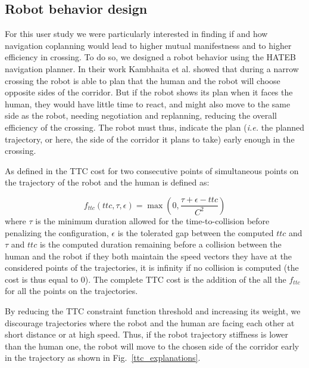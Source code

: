 \documentclass[a4paper,11pt,twoside]{StyleThese}
\begin{document}
\subsection{Robot behavior design}
For this user study we were particularly interested in finding if and how navigation coplanning would lead to higher mutual manifestness and to higher efficiency in crossing.
To do so, we designed a robot behavior using the HATEB navigation planner.
In their work Kambhaita et al. showed that during a narrow crossing the robot is able to plan that the human and the robot will choose opposite sides of the corridor. But if the robot shows its plan when it faces the human, they would have little time to react, and might also move to the same side as the robot, needing negotiation and replanning, reducing the overall efficiency of the crossing. The robot must thus, indicate the plan (\textit{i.e.} the planned trajectory, or here, the side of the corridor it plans to take) early enough in the crossing.

As defined in \cite{khambhaita_viewing_2017} the TTC cost for two consecutive points of simultaneous points on the trajectory of the robot and the human is defined as:

\begin{equation}\label{eq:ttc}
f_{ttc}(ttc, \tau, \epsilon) = \max(0, \frac{\tau + \epsilon - ttc}{C^2})
\end{equation}
where $\tau$ is the minimum duration allowed for the time-to-collision before penalizing the configuration, $\epsilon$ is the tolerated gap between the computed $ttc$ and $\tau$ and $ttc$ is the computed duration remaining before a collision between the human and the robot if they both maintain the speed vectors they have at the considered points of the trajectories, it is infinity if no collision is computed (the cost is thus equal to 0). The complete TTC cost is the addition of the all the $f_{ttc}$ for all the points on the trajectories.

By reducing the TTC constraint function threshold and increasing its weight, we discourage trajectories where the robot and the human are facing each other at short distance or at high speed. Thus, if the robot trajectory stiffness is lower than the human one, the robot will move to the chosen side of the corridor early in the trajectory as shown in Fig.~\ref{ttc_explanations}.
\end{document}
